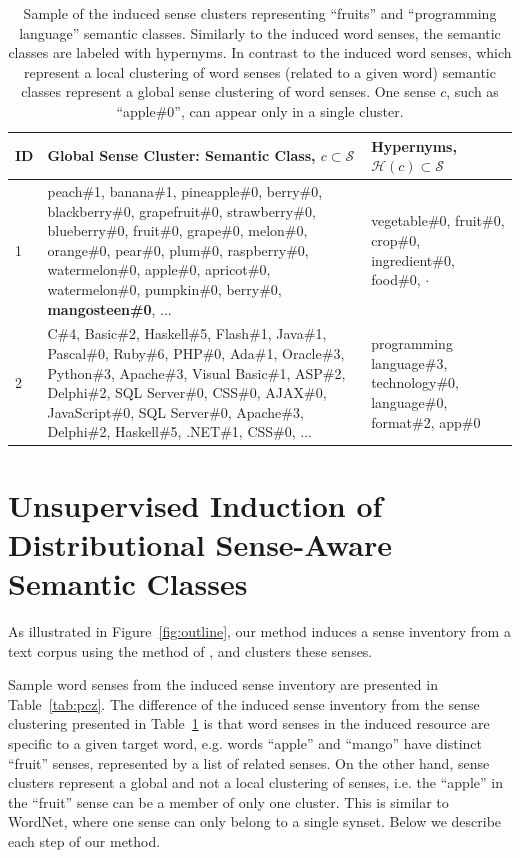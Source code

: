 \documentclass[10pt, a4paper]{article}
\begin{document}
\begin{table}[ht]
\centering
\footnotesize
\begin{tabular}{l|p{4.5in}|p{1.5in}} 
\bf ID &  \bf Global Sense Cluster: Semantic Class, $c \subset \mathcal{S}$ & \bf Hypernyms, $\mathcal{H}(c) \subset \mathcal{S}$  \\ 

\toprule

1 & peach\#1, banana\#1, pineapple\#0, berry\#0, blackberry\#0, grapefruit\#0, strawberry\#0, blueberry\#0, fruit\#0, grape\#0, melon\#0, orange\#0, pear\#0, plum\#0, raspberry\#0, watermelon\#0, apple\#0, apricot\#0, watermelon\#0, pumpkin\#0, berry\#0, \textbf{mangosteen\#0}, ...  & vegetable\#0, fruit\#0, crop\#0, ingredient\#0, food\#0, $\cdot$ \\ 

\midrule

2  & C\#4, Basic\#2, Haskell\#5, Flash\#1, Java\#1, Pascal\#0, Ruby\#6, PHP\#0, Ada\#1, Oracle\#3, Python\#3, Apache\#3, Visual Basic\#1, ASP\#2, Delphi\#2, SQL Server\#0, CSS\#0, AJAX\#0, JavaScript\#0, SQL Server\#0, Apache\#3, Delphi\#2, Haskell\#5, .NET\#1, CSS\#0, ... & programming language\#3, technology\#0, language\#0, format\#2, app\#0
\end{tabular}
\caption{Sample of the induced  sense clusters representing ``fruits'' and ``programming language'' semantic classes. Similarly to the induced word senses, the semantic classes are labeled with hypernyms. In contrast to the induced word senses, which represent a local clustering of word senses (related to a given word) semantic classes represent a global sense clustering of word senses. One sense $c$, such as ``apple\#0'', can appear only in a single cluster.
}
\label{tab:coset}
\end{table}



\section{Unsupervised Induction of Distributional Sense-Aware Semantic Classes}
\label{sec:clustering}

As illustrated in Figure~\ref{fig:outline}, our method   induces a sense inventory from a text corpus using the method of \cite{Faralli:16,biemann2018framework}, and clusters these senses.

Sample word senses from the induced sense inventory are presented in Table~\ref{tab:pcz}. The difference of the induced sense inventory from the sense clustering presented in Table~\ref{tab:coset} is that word senses in the induced resource are specific to a given target word, e.g. words ``apple'' and ``mango'' have distinct ``fruit'' senses, represented by a list of related senses. On the other hand, sense clusters represent a global and not a local clustering of senses, i.e. the ``apple'' in the ``fruit'' sense can be a member of only one cluster. This is similar to WordNet, where one sense can only belong to a single synset. Below we describe each step of our method.
\end{document}
